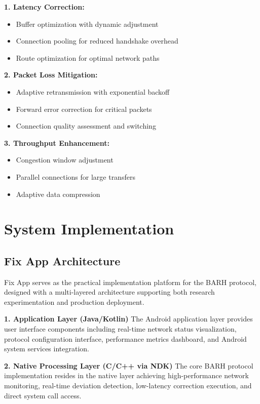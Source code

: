 \documentclass[conference]{IEEEtran}
\begin{document}
\textbf{1. Latency Correction:}
\begin{itemize}
\item Buffer optimization with dynamic adjustment
\item Connection pooling for reduced handshake overhead
\item Route optimization for optimal network paths
\end{itemize}

\textbf{2. Packet Loss Mitigation:}
\begin{itemize}
\item Adaptive retransmission with exponential backoff
\item Forward error correction for critical packets
\item Connection quality assessment and switching
\end{itemize}

\textbf{3. Throughput Enhancement:}
\begin{itemize}
\item Congestion window adjustment
\item Parallel connections for large transfers
\item Adaptive data compression
\end{itemize}

\section{System Implementation}

\subsection{Fix App Architecture}

Fix App serves as the practical implementation platform for the BARH protocol, designed with a multi-layered architecture supporting both research experimentation and production deployment.

\textbf{1. Application Layer (Java/Kotlin)}
The Android application layer provides user interface components including real-time network status visualization, protocol configuration interface, performance metrics dashboard, and Android system services integration.

\textbf{2. Native Processing Layer (C/C++ via NDK)}
The core BARH protocol implementation resides in the native layer achieving high-performance network monitoring, real-time deviation detection, low-latency correction execution, and direct system call access.
\end{document}
